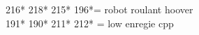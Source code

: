 	216* 218* 215* 196*= robot roulant hoover \\
	
	191* 190* 211* 212* = low enregie cpp\\
%
%	
%	
%
%	
%
%
%
